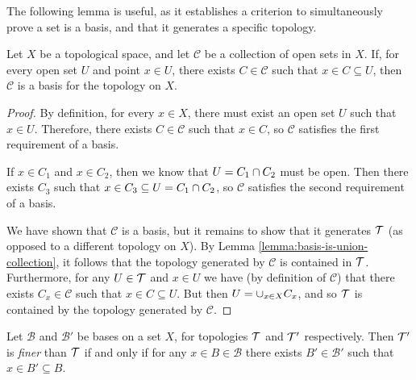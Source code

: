 \begin{rmk}
    The following lemma is useful, as it establishes a criterion to simultaneously prove a set is a basis, and that it generates a specific topology.
\end{rmk}

\begin{lemma}\label{lemma:basis-criterion}
    Let $X$ be a topological space, and let $\mathcal{C}$ be a collection of open sets in $X$. If, for every open set $U$ and point $x \in U$, there exists $C \in \mathcal{C}$ such that $x \in C \subseteq U$, then $\mathcal{C}$ is a basis for the topology on $X$.
\end{lemma}

\begin{proof}
    By definition, for every $x \in X$, there must exist an open set $U$ such that $x \in U$. Therefore, there exists $C \in \mathcal{C}$ such that $x \in C$, so $\mathcal{C}$ satisfies the first requirement of a basis.

    If $x \in C_1$ and $x \in C_2$, then we know that $U = C_1 \cap C_2$ must be open. Then there exists $C_3$ such that $x \in C_3 \subseteq U = C_1 \cap C_2$, so $\mathcal{C}$ satisfies the second requirement of a basis.

    We have shown that $\mathcal{C}$ is a basis, but it remains to show that it generates $\mathcal{T}$ (as opposed to a different topology on $X$). By Lemma \ref{lemma:basis-is-union-collection}, it follows that the topology generated by $\mathcal{C}$ is contained in $\mathcal{T}$. Furthermore, for any $U \in \mathcal{T}$ and $x \in U$ we have (by definition of $\mathcal{C}$) that there exists $C_x \in \mathcal{C}$ such that $x \in C \subseteq U$. But then $U = \cup_{x\in X}C_x$, and so $\mathcal{T}$ is contained by the topology generated by $\mathcal{C}$.
\end{proof}

\begin{lemma}\label{lemma:subbasis-finer-topology}
    Let $\mathcal{B}$ and $\mathcal{B}'$ be bases on a set $X$, for topologies $\mathcal{T}$ and $\mathcal{T}'$ respectively. Then $\mathcal{T}'$ is \emph{finer} than $\mathcal{T}$ if and only if for any $x \in B \in \mathcal{B}$ there exists $B' \in \mathcal{B}'$ such that $x \in B' \subseteq B$.
\end{lemma}

